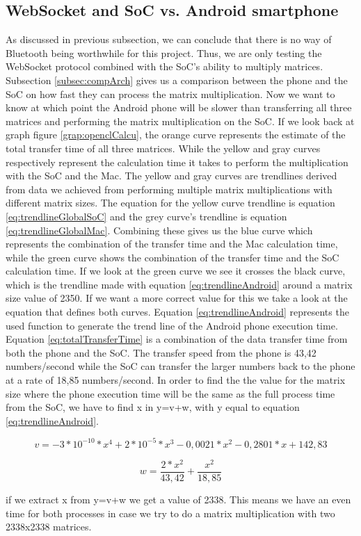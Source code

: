 \documentclass[a4paper, 11pt]{report}
\begin{document}
\subsection{WebSocket and SoC vs. Android smartphone}
As discussed in previous subsection, we can conclude that there is no way of Bluetooth being worthwhile for this project. Thus, we are only testing the WebSocket protocol combined with the SoC's ability to multiply matrices. Subsection \ref{subsec:compArch} gives us a comparison between the phone and the SoC on how fast they can process the matrix multiplication. Now we want to know at which point the Android phone will be slower than transferring all three matrices and performing the matrix multiplication on the SoC. If we look back at graph figure \ref{grap:openclCalcu}, the orange curve represents the estimate of the total transfer time of all three matrices. While the yellow and gray curves respectively represent the calculation time it takes to perform the multiplication with the SoC and the Mac. The yellow and gray curves are trendlines derived from data we achieved from performing multiple matrix multiplications with different matrix sizes. The equation for the yellow curve trendline is equation \ref{eq:trendlineGlobalSoC} and the grey curve's trendline is equation \ref{eq:trendlineGlobalMac}. Combining these gives us the blue curve which represents the combination of the transfer time and the Mac calculation time, while the green curve shows the combination of the transfer time and the SoC calculation time. If we look at the green curve we see it crosses the black curve, which is the trendline made with equation \ref{eq:trendlineAndroid} around a matrix size value of 2350. If we want a more correct value for this we take a look at the equation that defines both curves. Equation \ref{eq:trendlineAndroid} represents the used function to generate the trend line of the Android phone execution time. Equation \ref{eq:totalTransferTime} is a combination of the data transfer time from both the phone and the SoC. The transfer speed from the phone is 43,42 numbers/second while the SoC can transfer the larger numbers back to the phone at a rate of 18,85 numbers/second. In order to find the the value for the matrix size where the phone execution time will be the same as the full process time from the SoC, we have to find x in y=v+w, with y equal to equation \ref{eq:trendlineAndroid}.

\begin{equation} \label{eq:totalCalcTimeSoC}
v = -3*10^{-10}*x^4+2*10^{-5}*x^3-0,0021*x^2-0,2801*x+142,83
\end{equation}

\begin{equation} \label{eq:totalTransferTime}
w = \frac{2*x^2}{43,42}+\frac{x^2}{18,85}
\end{equation}

if we extract x from y=v+w we get a value of 2338. This means we have an even time for both processes in case we try to do a matrix multiplication with two 2338x2338 matrices.




\end{document}
